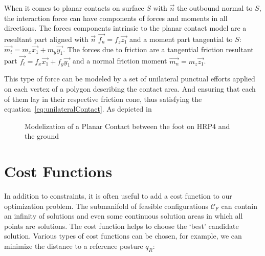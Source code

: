 When it comes to planar contacts on surface $S$ with $\vec{n}$ the outbound normal to $S$, the interaction force can have components of forces and moments in all directions.
The forces components intrinsic to the planar contact model are a resultant part aligned with $\vec{n}$ $\vec{f_n} = f_z \vec{z_1}$ and a moment part tangential to $S$: $\vec{m_t} = m_x \vec{x_1} + m_y \vec{y_1}$.
The forces due to friction are a tangential friction resultant part $\vec{f_t} = f_x \vec{x_1} + f_y \vec{y_1}$ and a normal friction moment $\vec{m_n} = m_z \vec{z_1}$.

This type of force can be modeled by a set of unilateral punctual efforts applied on each vertex of a polygon describing the contact area.
And ensuring that each of them lay in their respective friction cone, thus satisfying the equation~\ref{eq:unilateralContact}. As depicted in~

\begin{figure}[htpb]
  \centering
  \setlength{\fboxsep}{0pt}%
  \setlength{\fboxrule}{1pt}%
  \caption{Modelization of a Planar Contact between the foot on HRP4 and the ground}
\label{fig:planarContact}
\end{figure}



\section{Cost Functions}
\label{sec:cost_functions}


In addition to constraints, it is often useful to add a cost function to our optimization problem.
The submanifold of feasible configurations $\mathcal{C}_F$ can contain an infinity of solutions and even some continuous solution areas in which all points are solutions.
The cost function helps to choose the `best' candidate solution.
Various types of cost functions can be chosen, for example, we can minimize the distance to a reference posture $q_R$:


